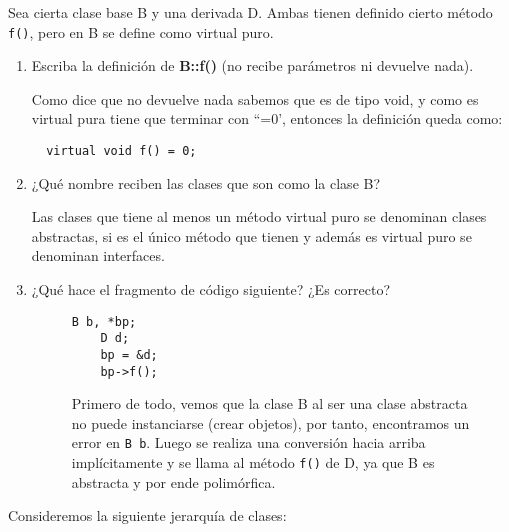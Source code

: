  Sea cierta clase base B y una derivada D. Ambas tienen definido cierto método \texttt{f()}, pero en B se define como virtual puro.
\begin{enumerate}[label = \alph*)]
  \item Escriba la definición de \textbf{B::f()} (no recibe parámetros ni
  devuelve nada).

  Como dice que no devuelve nada sabemos que es de tipo void, y como es virtual pura tiene que terminar con ``=0', entonces la definición queda como:

  \begin{verbatim} 
  virtual void f() = 0;
  \end{verbatim}

  \item  ¿Qué nombre reciben las clases que son como la clase B?
  
  Las clases que tiene al menos un método virtual puro se denominan clases abstractas, si es el único método que tienen y además es virtual puro se denominan interfaces.
  \item ¿Qué hace el fragmento de código siguiente? ¿Es correcto?
 \begin{figure}[h]
  \begin{minipage}{0.25\textwidth}
    \begin{center}
      \begin{lstlisting}[frame = single]
    B b, *bp;
    D d;
    bp = &d;
    bp->f();
      \end{lstlisting}
    \end{center}
  \end{minipage}
  \hfill
  \begin{minipage}{0.7\textwidth}
    Primero de todo, vemos que la clase B al ser una clase abstracta no puede instanciarse (crear objetos), por tanto, encontramos un error en \texttt{B b}. Luego se realiza una conversión hacia arriba implícitamente y se llama al método \texttt{f()} de D, ya que B es abstracta y por ende polimórfica.
    
  \end{minipage}

 \end{figure}
\end{enumerate}
 Consideremos la siguiente jerarquía de clases:

